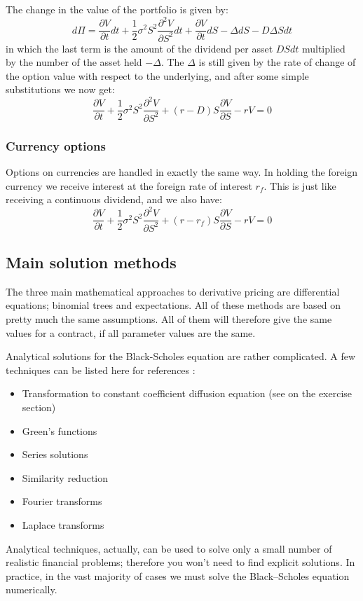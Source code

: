 The change in the value of the portfolio is given by:
\begin{equation}
    d\Pi = \frac{\partial V}{\partial t} dt + \frac{1}{2} \sigma^2 S^2 \frac{\partial^2 V}{\partial S^2} dt + \frac{\partial V}{\partial t} dS - \Delta dS - D \Delta S dt
\end{equation}
in which the last term is the amount of the dividend per asset $D S dt$ multiplied by the number of the asset held $-\Delta$. The $\Delta$ is still given by the rate of change of the option value with respect to the underlying, and after some simple substitutions we now get:
\begin{equation}
    \frac{\partial V}{\partial t} + \frac{1}{2} \sigma^2 S^2 \frac{\partial^2 V}{\partial S^2} + (r-D) S \frac{\partial V}{\partial S} - r V = 0
\end{equation}



\subsubsection{Currency options}
Options on currencies are handled in exactly the same way. In holding the foreign currency we receive interest at the foreign rate of interest $r_f$. This is just like receiving a continuous dividend, and we also have:
\begin{equation}
    \frac{\partial V}{\partial t} + \frac{1}{2} \sigma^2 S^2 \frac{\partial^2 V}{\partial S^2} + (r-r_f) S \frac{\partial V}{\partial S} - r V = 0
\end{equation}



\subsection{Main solution methods}
The three main mathematical approaches to derivative pricing are differential equations; binomial trees and expectations. All of these methods are based on pretty much the same assumptions. All of them will therefore give the same values for a contract, if all parameter values are the same. 

Analytical solutions for the Black-Scholes equation are rather complicated. A few techniques can be listed here for references \cite{pw_iqf2ed_2007}:
\begin{itemize}
	\setlength\itemsep{0em}
	\item Transformation to constant coefficient diffusion equation (see on the exercise section)
	\item Green's functions
	\item Series solutions
	\item Similarity reduction
	\item Fourier transforms
	\item Laplace transforms
\end{itemize} 
Analytical techniques, actually, can be used to solve only a small number of realistic financial problems; therefore you won't need to find explicit solutions. In practice, in the vast majority of cases we must solve the Black–Scholes equation numerically.   

